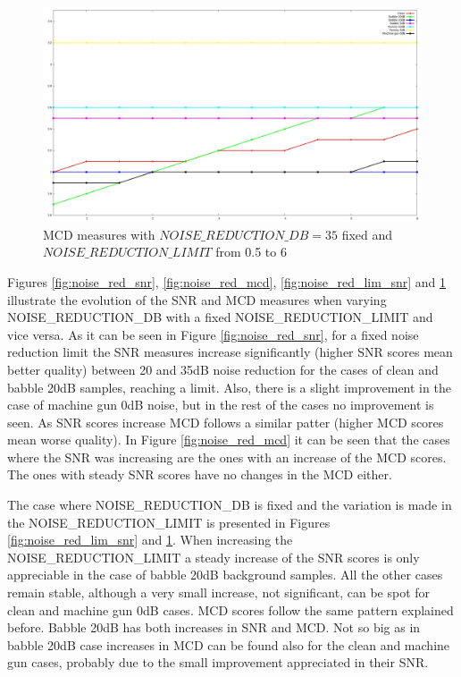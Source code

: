 \begin{figure}[!htb]
\begin{centering}
\includegraphics[width=\textwidth]{images/noise_red_lim_mcd_exp.jpg}
\caption{MCD measures with $NOISE\_REDUCTION\_DB = 35$ fixed and $NOISE\_REDUCTION\_LIMIT$ from 0.5 to 6}
\label{fig:noise_red_lim_mcd}
\end{centering}
\end{figure}
Figures \ref{fig:noise_red_snr}, \ref{fig:noise_red_mcd}, \ref{fig:noise_red_lim_snr} and \ref{fig:noise_red_lim_mcd} illustrate the evolution of the SNR and MCD measures when varying NOISE\_REDUCTION\_DB with a fixed NOISE\_REDUCTION\_LIMIT and vice versa.
%
As it can be seen in Figure \ref{fig:noise_red_snr}, for a fixed noise reduction limit the SNR measures increase significantly (higher SNR scores mean better quality) between 20 and 35dB noise reduction for the cases of clean and babble 20dB samples, reaching a limit.
%
Also, there is a slight improvement in the case of machine gun 0dB noise, but in the rest of the cases no improvement is seen.
%
As SNR scores increase MCD follows a similar patter (higher MCD scores mean worse quality).
%
In Figure \ref{fig:noise_red_mcd} it can be seen that the cases where the SNR was increasing are the ones with an increase of the MCD scores.
%
The ones with steady SNR scores have no changes in the MCD either.

The case where NOISE\_REDUCTION\_DB is fixed and the variation is made in the NOISE\_REDUCTION\_LIMIT is presented in Figures \ref{fig:noise_red_lim_snr} and \ref{fig:noise_red_lim_mcd}.
%
When increasing the NOISE\_REDUCTION\_LIMIT a steady increase of the SNR scores is only appreciable in the case of babble 20dB background samples.
%
All the other cases remain stable, although a very small increase, not significant, can be spot for clean and machine gun 0dB cases.
%
MCD scores follow the same pattern explained before. 
%
Babble 20dB has both increases in SNR and MCD.
% 
Not so big as in babble 20dB case increases in MCD can be found also for the clean and machine gun cases, probably due to the small improvement appreciated in their SNR.

